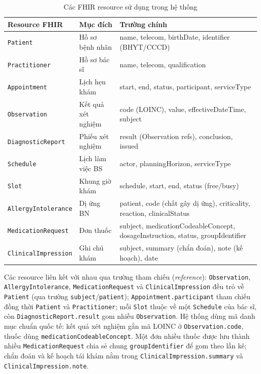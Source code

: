 \documentclass[a4paper,13pt,3p,oneside]{report}
\theoremstyle{definition}
\theoremstyle{remark}
\theoremstyle{definition}
\begin{document}
\begin{table}[H]
\centering
\begin{tabular}{|l|l|p{7cm}|}
\hline
\textbf{Resource FHIR} & \textbf{Mục đích} & \textbf{Trường chính} \\
\hline
\texttt{Patient} & Hồ sơ bệnh nhân & name, telecom, birthDate, identifier (BHYT/CCCD) \\
\hline
\texttt{Practitioner} & Hồ sơ bác sĩ & name, telecom, qualification \\
\hline
\texttt{Appointment} & Lịch hẹn khám & start, end, status, participant, serviceType \\
\hline
\texttt{Observation} & Kết quả xét nghiệm & code (LOINC), value, effectiveDateTime, subject \\
\hline
\texttt{DiagnosticReport} & Phiếu xét nghiệm & result (Observation refs), conclusion, issued \\
\hline
\texttt{Schedule} & Lịch làm việc BS & actor, planningHorizon, serviceType \\
\hline
\texttt{Slot} & Khung giờ khám & schedule, start, end, status (free/busy) \\
\hline
\texttt{AllergyIntolerance} & Dị ứng BN & patient, code (chất gây dị ứng), criticality, reaction, clinicalStatus \\
\hline
\texttt{MedicationRequest} & Đơn thuốc & subject, medicationCodeableConcept, dosageInstruction, status, groupIdentifier \\
\hline
\texttt{ClinicalImpression} & Ghi chú khám & subject, summary (chẩn đoán), note (kế hoạch), date \\
\hline
\end{tabular}
\caption{Các FHIR resource sử dụng trong hệ thống}
\label{tab:fhir-resources}
\end{table}

Các resource liên kết với nhau qua trường tham chiếu (\textit{reference}): \texttt{Observation}, \texttt{AllergyIntolerance}, \texttt{MedicationRequest} và \texttt{ClinicalImpression} đều trỏ về \texttt{Patient} (qua trường \texttt{subject}/\texttt{patient}); \texttt{Appointment.participant} tham chiếu đồng thời \texttt{Patient} và \texttt{Practitioner}; mỗi \texttt{Slot} thuộc về một \texttt{Schedule} của bác sĩ, còn \texttt{DiagnosticReport.result} gom nhiều \texttt{Observation}. Hệ thống dùng mã danh mục chuẩn quốc tế: kết quả xét nghiệm gắn mã LOINC ở \texttt{Observation.code}, thuốc dùng \texttt{medicationCodeableConcept}. Một đơn nhiều thuốc được lưu thành nhiều \texttt{MedicationRequest} chia sẻ chung \texttt{groupIdentifier} để gom theo lần kê; chẩn đoán và kế hoạch tái khám nằm trong \texttt{ClinicalImpression.summary} và \texttt{ClinicalImpression.note}.
\end{document}
